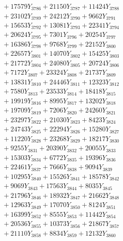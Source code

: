 \documentclass[a4paper,10pt]{article}
\begin{document}
{\begin{align}
&\;  + 17579 Y_{3786} + 21150 Y_{3787} + 11424 Y_{3788} \\[0.3ex]
&\;  + 23102 Y_{3789} + 24212 Y_{3790} + 9662 Y_{3791} \\[0.3ex]
&\;  + 15653 Y_{3792} + 13081 Y_{3793} + 22341 Y_{3794} \\[0.3ex]
&\;  + 20624 Y_{3795} + 7301 Y_{3796} + 20254 Y_{3797} \\[0.3ex]
&\;  + 16386 Y_{3798} + 9768 Y_{3799} + 22152 Y_{3800} \\[0.3ex]
&\;  + 22657 Y_{3801} + 14070 Y_{3802} + 15425 Y_{3803} \\[0.3ex]
&\;  + 21772 Y_{3804} + 24080 Y_{3805} + 20724 Y_{3806} \\[0.3ex]
&\;  + 7172 Y_{3807} + 23324 Y_{3808} + 21737 Y_{3809} \\[0.5ex]\allowbreak
&\;  + 13831 Y_{3810} + 24446 Y_{3811} + 12323 Y_{3812} \\[0.3ex]
&\;  + 7580 Y_{3813} + 23533 Y_{3814} + 18418 Y_{3815} \\[0.3ex]
&\;  + 19919 Y_{3816} + 8995 Y_{3817} + 13202 Y_{3818} \\[0.3ex]
&\;  + 19709 Y_{3819} + 7206 Y_{3820} + 24260 Y_{3821} \\[0.3ex]
&\;  + 23297 Y_{3822} + 21030 Y_{3823} + 8423 Y_{3824} \\[0.3ex]
&\;  + 24743 Y_{3825} + 22294 Y_{3826} + 15280 Y_{3827} \\[0.3ex]
&\;  + 11220 Y_{3828} + 23268 Y_{3829} + 18217 Y_{3830} \\[0.3ex]
&\;  + 9255 Y_{3831} + 20390 Y_{3832} + 20055 Y_{3833} \\[0.3ex]
&\;  + 15303 Y_{3834} + 6772 Y_{3835} + 19396 Y_{3836} \\[0.3ex]
&\;  + 22461 Y_{3837} + 7666 Y_{3838} + 9094 Y_{3839} \\[0.5ex]\allowbreak
&\;  + 10295 Y_{3840} + 15526 Y_{3841} + 18578 Y_{3842} \\[0.3ex]
&\;  + 9069 Y_{3843} + 17563 Y_{3844} + 8035 Y_{3845} \\[0.3ex]
&\;  + 21796 Y_{3846} + 18932 Y_{3847} + 21662 Y_{3848} \\[0.3ex]
&\;  + 12963 Y_{3849} + 17070 Y_{3850} + 8124 Y_{3851} \\[0.3ex]
&\;  + 16399 Y_{3852} + 8555 Y_{3853} + 11442 Y_{3854} \\[0.3ex]
&\;  + 20536 Y_{3855} + 10373 Y_{3856} + 21867 Y_{3857} \\[0.3ex]
&\;  + 21110 Y_{3858} + 8834 Y_{3859} + 12132 Y_{3860} \\[0.3ex]

\end{align}}
\end{document}
